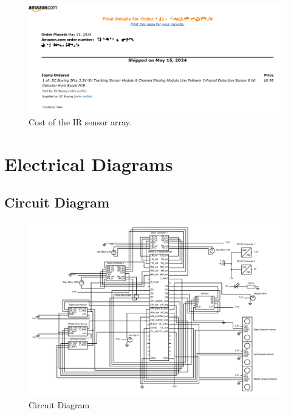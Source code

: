 \documentclass[12pt]{report}
\begin{document}
\begin{figure}[H]
    \centering
    \includegraphics[width=1\textwidth]{Images/Cost/ir_cost.pdf}
    \caption{Cost of the \gls{IR} sensor array.}
    \label{fig:enter-label}
\end{figure}

\section{Electrical Diagrams}
\subsection{Circuit Diagram}
\begin{figure}[H]
    \centering
    \includegraphics[width = 1.1\textwidth,angle=270, keepaspectratio]{Images/Diagrams/robot_pinout.pdf}
    \caption{Circuit Diagram}
    \label{fig:CircuitDiagram}
\end{figure}
\end{document}
